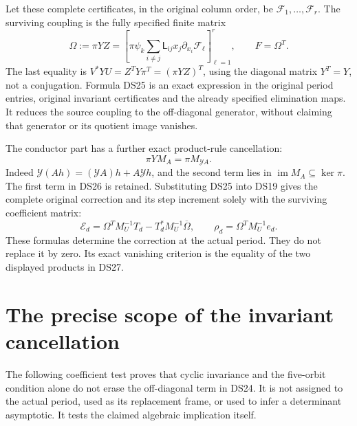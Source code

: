 \documentclass[11pt]{article}
\begin{document}
Let these complete certificates, in the original column order, be
\(\mathcal F_1,\ldots,\mathcal F_r\). The surviving coupling is the
fully specified finite matrix
\begin{equation}\label{eq:omega}
\boxed{\Omega:=\pi YZ
=\left[\pi\psi_k
 \sum_{i\ne j}\mathsf L_{ij}x_j\partial_{x_i}\mathcal F_\ell
 \right]_{\ell=1}^r,
\qquad F=\Omega^T.}
\tag{DS25}
\end{equation}
The last equality is \(V^*YU=Z^TY\pi^T=(\pi YZ)^T\), using
the diagonal matrix \(Y^T=Y\), not a conjugation. Formula DS25 is
an exact expression in the original period entries, original invariant
certificates and the already specified elimination maps. It reduces
the source coupling to the off-diagonal generator, without claiming
that generator or its quotient image vanishes.

The conductor part has a further exact product-rule cancellation:
\begin{equation}\label{eq:conductor-cancel}
\pi Y M_A=\pi M_{\mathcal Y A}.
\tag{DS26}
\end{equation}
Indeed \(\mathcal Y(Ah)=(\mathcal YA)h+A\mathcal Yh\), and the
second term lies in \(\operatorname{im}M_A\subseteq\ker\pi\).
The first term in DS26 is retained. Substituting DS25 into DS19 gives
the complete original correction and its step increment solely with
the surviving coefficient matrix:
\begin{equation}\label{eq:omega-correction}
\mathcal E_d=\Omega^TM_U^{-1}T_d-T_d^*M_U^{-1}\overline\Omega,
\qquad \rho_d=\Omega^TM_U^{-1}e_d.
\tag{DS27}
\end{equation}
These formulas determine the correction at the actual period. They do
not replace it by zero. Its exact vanishing criterion is the equality
of the two displayed products in DS27.

\section{The precise scope of the invariant cancellation}

The following coefficient test proves that cyclic invariance and the
five-orbit condition alone do not erase the off-diagonal term in DS24.
It is not assigned to the actual period, used as its replacement frame,
or used to infer a determinant asymptotic. It tests the claimed
algebraic implication itself.
\end{document}
